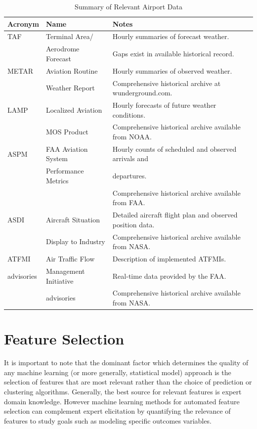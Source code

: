 \documentclass[11pt]{scrartcl}
\begin{document}
\begin{table}[h]
\caption{Summary of Relevant Airport Data}
\begin{center}
\begin{tabular}{|l|l|l|}
\hline
{\bf Acronym} & {\bf Name} & {\bf Notes}\\
\hline
TAF & Terminal Area/& Hourly summaries of forecast weather.\\
& Aerodrome Forecast & Gaps exist in available historical record.\\
\hline
METAR & Aviation Routine & Hourly summaries of observed weather.\\
& Weather Report & Comprehensive historical archive at wunderground.com.\\
\hline
LAMP & Localized Aviation & Hourly forecasts of future weather conditions.\\
& MOS Product & Comprehensive historical archive available from NOAA.\\
\hline
ASPM & FAA Aviation System & Hourly counts of scheduled and observed arrivals and\\
& Performance Metrics & departures.\\
& & Comprehensive historical archive available from FAA.\\
\hline
ASDI & Aircraft Situation & Detailed aircraft flight plan and observed position data.\\
& Display to Industry & Comprehensive historical archive available from NASA.\\
\hline
ATFMI & Air Traffic Flow & Description of implemented ATFMIs.\\
advisories & Management Initiative & Real-time data provided by the FAA.\\
& advisories & Comprehensive historical archive available from NASA.\\
\hline
\end{tabular}
\end{center}
\label{default}
\end{table}

\section{Feature Selection}
It is important to note that the dominant factor which determines the quality of any machine learning (or more generally, statistical model) approach is the selection of features that are most relevant rather than the choice of prediction or clustering algorithms.  Generally, the best source for relevant features is expert domain knowledge.  However machine learning methods for automated feature selection can complement expert elicitation by quantifying the relevance of  features to study goals such as modeling specific outcomes variables.
\end{document}

